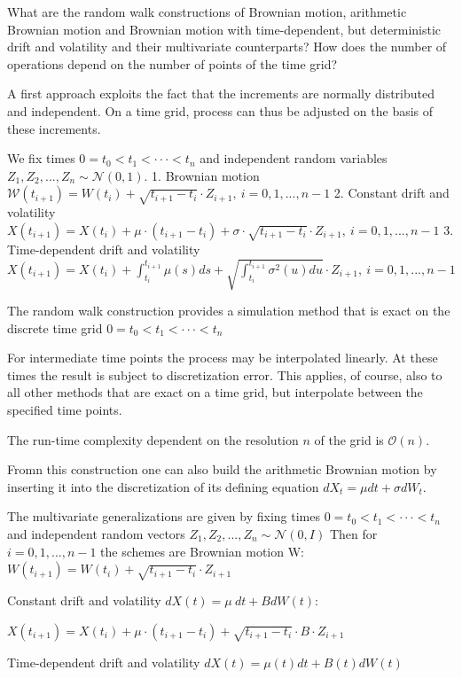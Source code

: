 What are the random walk constructions of Brownian motion, arithmetic Brownian
motion and Brownian motion with time-dependent, but deterministic drift and
volatility and their multivariate counterparts? 
How does the number of operations depend on the number of points of
the time grid?

A first approach exploits the fact that the increments are normally distributed and independent.
On a time grid, process can thus be adjusted on the basis of these increments.

We fix times \(0=t_{0}<t_{1}<\cdot\cdot\cdot<t_{n}\) and independent random variables \(Z_{1},Z_{2},..., Z_{n}\sim\mathcal{N}(0,1).\)
1. Brownian motion
\(\mathcal{W}(t_{i+1})=W(t_{i})+\sqrt{t_{i+1}-t_{i}}\cdot Z_{i+1},\ i=0,1,...,n-1\)
2. Constant drift and volatility
\(X(t_{i+1})=X(t_{i})+\mu\cdot(t_{i+1}-t_{i})+\sigma\cdot\sqrt{t_{i+1}-t_{i}}\cdot Z_{i+1},\ i=0,1,...,n-1\)
3. Time-dependent drift and volatility
\(X(t_{i+1})=X(t_{i})+\int_{t_{i}}^{t_{i+1}}\mu(s)ds+\sqrt{\int_{t_{i}}^{t_{i+1}}\sigma^{2}(u)du}\cdot Z_{i+1},\ i=0,1,...,n-1\)

The random walk construction provides a simulation method that is exact on the discrete time grid
\(0=t_{0}<t_{1}<\cdot\cdot\cdot<t_{n}\)

For intermediate time points the process may be interpolated linearly. At these times the result is subject to
discretization error.
This applies, of course, also to all other methods that are exact on a time grid, but interpolate between the
specified time points.

The run-time complexity dependent on the resolution \( n \) of the grid is \( \mathcal{O}(n) \).

Fromn this construction one can also build the arithmetic Brownian motion by inserting it into the discretization
of its defining equation
\(dX_t = \mu dt + \sigma dW_t \).

The multivariate generalizations are given by
fixing times \(0=t_{0}<t_{1}<\cdot\cdot\cdot<t_{n}\) and independent random vectors \(Z_{1},Z_{2},...,Z_{n}\sim\mathcal{N}(0,I)\)
Then for \( i=0,1,...,n-1\) the schemes are
Brownian motion W:
\(W(t_{i+1})=W(t_{i})+\sqrt{t_{i+1}-t_{i}}\cdot Z_{i+1}\)

Constant drift and volatility \(dX(t)=\mu~dt+BdW(t)\):

\(X(t_{i+1})=X(t_{i}) + \mu \cdot (t_{i+1}-t_{i}) + \sqrt{t_{i+1}-t_{i}} \cdot B \cdot Z_{i+1}\)

Time-dependent drift and volatility \(dX(t)=\mu(t)dt+B(t)dW(t)\)

